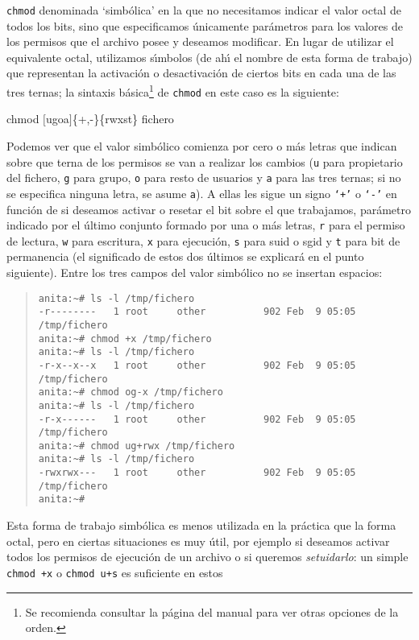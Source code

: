 {\tt chmod} denominada `simb\'olica' en la que no necesitamos indicar el valor
octal de todos los bits, sino que especificamos \'unicamente par\'ametros 
para los valores de los permisos que el archivo posee y deseamos modificar. En
lugar de utilizar el equivalente octal, utilizamos s\'{\i}mbolos (de ah\'{\i}
el nombre de esta forma de trabajo) que representan la activaci\'on o 
desactivaci\'on de ciertos bits en cada una de las tres ternas; la sintaxis
b\'asica\footnote{Se recomienda consultar la p\'agina del manual para ver otras
opciones de la orden.} de {\tt chmod} en este caso es la siguiente:
\it
\begin{center}
chmod $[$ugoa$]$\{+,-\}\{rwxst\} fichero 
\end{center}
\rm
Podemos ver que el valor simb\'olico comienza por cero o m\'as letras que 
indican sobre que terna de los permisos se van a realizar los cambios ({\tt u} 
para propietario del fichero, {\tt g} para grupo, {\tt o} para resto de 
usuarios y {\tt a} para las tres ternas; si no se especifica ninguna letra, se
asume {\tt a}). A ellas les sigue un signo {\tt `+'} o {\tt `-'} en funci\'on
de si deseamos activar o resetar el bit sobre el que trabajamos, par\'ametro
indicado por el \'ultimo conjunto formado por una o m\'as letras, {\tt r} para
el permiso de lectura, {\tt w} para escritura, {\tt x} para ejecuci\'on, {\tt s}
para {\sc suid} o {\sc sgid} y {\tt t} para bit de permanencia (el significado
de estos dos \'ultimos se explicar\'a en el punto siguiente). Entre los tres
campos del valor simb\'olico no se insertan espacios:
\begin{quote}
\begin{verbatim}
anita:~# ls -l /tmp/fichero
-r--------   1 root     other          902 Feb  9 05:05 /tmp/fichero
anita:~# chmod +x /tmp/fichero
anita:~# ls -l /tmp/fichero
-r-x--x--x   1 root     other          902 Feb  9 05:05 /tmp/fichero
anita:~# chmod og-x /tmp/fichero
anita:~# ls -l /tmp/fichero
-r-x------   1 root     other          902 Feb  9 05:05 /tmp/fichero
anita:~# chmod ug+rwx /tmp/fichero
anita:~# ls -l /tmp/fichero
-rwxrwx---   1 root     other          902 Feb  9 05:05 /tmp/fichero
anita:~# 
\end{verbatim}
\end{quote}
Esta forma de trabajo simb\'olica es menos utilizada en la pr\'actica que la
forma octal, pero en ciertas situaciones es muy \'util, por ejemplo si deseamos
activar todos los permisos de ejecuci\'on de un archivo o si queremos {\it 
setuidarlo}: un simple {\tt chmod +x} o {\tt chmod u+s} es suficiente en estos
